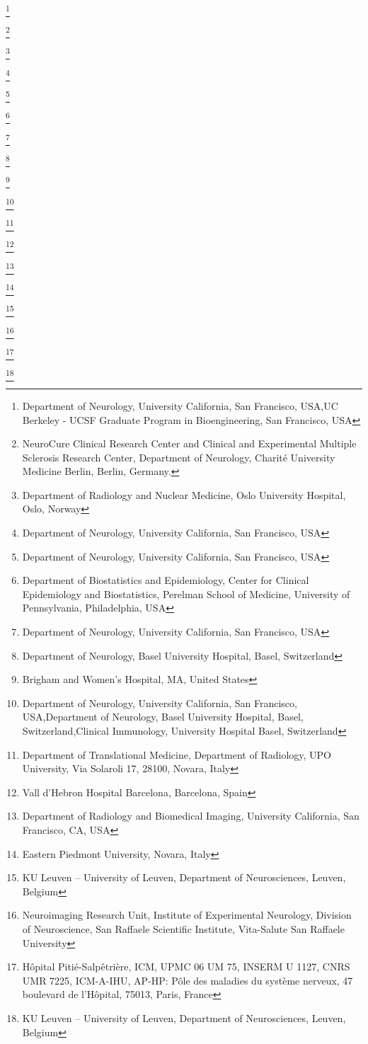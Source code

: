 \iflatexml
\author{Anisha Keshavan}\footnote[1,2]{Department of Neurology, University California, San Francisco,  USA,UC Berkeley - UCSF Graduate Program in Bioengineering, San Francisco, USA}
\author{Friedemann Paul}\footnote[3]{NeuroCure Clinical Research Center and Clinical and Experimental Multiple Sclerosis Research Center, Department of Neurology, Charité University Medicine Berlin, Berlin, Germany.}
\author{Mona K. Beyer}\footnote[4]{Department of Radiology and Nuclear Medicine, Oslo University Hospital, Oslo, Norway}
\author{Alyssa H. Zhu}\footnote[1]{Department of Neurology, University California, San Francisco,  USA}
\author{Nico Papinutto}\footnote[1]{Department of Neurology, University California, San Francisco,  USA}
\author{Russell Shinohara}\footnote[5]{Department of Biostatistics and Epidemiology, Center for Clinical Epidemiology and Biostatistics, Perelman School of Medicine, University of Pennsylvania, Philadelphia, USA}
\author{William Stern}\footnote[1]{Department of Neurology, University California, San Francisco,  USA}
\author{Michael Amann}\footnote[6]{Department of Neurology, Basel University Hospital, Basel, Switzerland}
\author{Rohit Bakshi}\footnote[7]{Brigham and Women's Hospital, MA, United States}
\author{Antje Bischof}\footnote[1,6,8]{Department of Neurology, University California, San Francisco,  USA,Department of Neurology, Basel University Hospital, Basel, Switzerland,Clinical Immunology, University Hospital Basel, Switzerland}
\author{Alessandro Carriero}\footnote[9]{Department of Translational Medicine, Department of Radiology,  UPO University, Via Solaroli 17, 28100, Novara, Italy}
\author{Manuel Comabella}\footnote[10]{Vall d’Hebron Hospital Barcelona, Barcelona, Spain}
\author{Jason C. Crane}\footnote[11]{Department of Radiology and Biomedical Imaging, University California, San Francisco, CA, USA}
\author{Sandra D’Alfonso}\footnote[12]{Eastern Piedmont University, Novara, Italy}
\author{Benedicte Dubois}\footnote[13]{ KU Leuven – University of Leuven, Department of Neurosciences, Leuven, Belgium}
\author{Massimo Filippi}\footnote[14]{Neuroimaging Research Unit, Institute of Experimental Neurology, Division of Neuroscience, San Raffaele Scientific Institute, Vita-Salute San Raffaele University}
\author{Bertrand Fontaine}\footnote[15]{Hôpital Pitié-Salpêtrière, ICM, UPMC 06 UM 75, INSERM U 1127, CNRS UMR 7225, ICM-A-IHU, AP-HP: Pôle des maladies du système nerveux, 47 boulevard de l'Hôpital, 75013, Paris, France}
\author{An Goris}\footnote[13]{ KU Leuven – University of Leuven, Department of Neurosciences, Leuven, Belgium}
